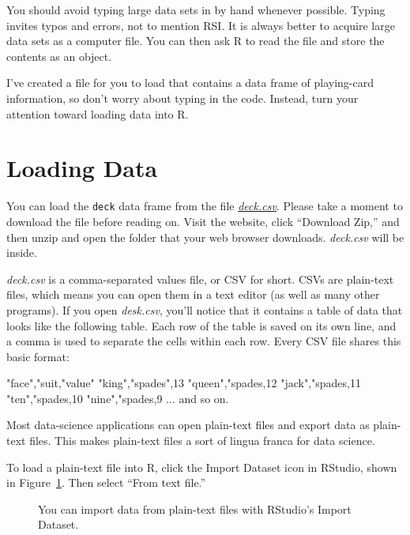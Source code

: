 \documentclass[
  letterpaper,
  DIV=11,
  numbers=noendperiod]{scrbook}
\makeatletter
\newenvironment{Shaded}{\begin{snugshade}}{\end{snugshade}}
\newcommand{\NormalTok}[1]{\textcolor[rgb]{0.00,0.23,0.31}{#1}}
\newcommand*\pandocbounded[1]{%
  \sbox\pandoc@box{#1}%
  \Gscale@div\@tempa{\textheight}{\dimexpr\ht\pandoc@box+\dp\pandoc@box\relax}%
  \Gscale@div\@tempb{\linewidth}{\wd\pandoc@box}%
  \ifdim\@tempb\p@<\@tempa\p@\let\@tempa\@tempb\fi%
  \ifdim\@tempa\p@<\p@\scalebox{\@tempa}{\usebox\pandoc@box}%
  \else\usebox{\pandoc@box}%
  \fi%
}
\makeatother
\begin{document}
You should avoid typing large data sets in by hand whenever possible.
Typing invites typos and errors, not to mention RSI. It is always better
to acquire large data sets as a computer file. You can then ask R to
read the file and store the contents as an object.

I've created a file for you to load that contains a data frame of
playing-card information, so don't worry about typing in the code.
Instead, turn your attention toward loading data into R.

\section{Loading Data}\label{sec-loading-data}

You can load the \texttt{deck} data frame from the file
\href{http://bit.ly/deck_CSV}{\emph{deck.csv}}. Please take a moment to
download the file before reading on. Visit the website, click ``Download
Zip,'' and then unzip and open the folder that your web browser
downloads. \emph{deck.csv} will be inside.

\emph{deck.csv} is a comma-separated values file, or CSV for short. CSVs
are plain-text files, which means you can open them in a text editor (as
well as many other programs). If you open \emph{desk.csv}, you'll notice
that it contains a table of data that looks like the following table.
Each row of the table is saved on its own line, and a comma is used to
separate the cells within each row. Every CSV file shares this basic
format:

\begin{Shaded}
\begin{Highlighting}[]
\NormalTok{"face","suit,"value"}
\NormalTok{"king","spades",13}
\NormalTok{"queen","spades,12}
\NormalTok{"jack","spades,11}
\NormalTok{"ten","spades,10}
\NormalTok{"nine","spades,9}
\NormalTok{... and so on.}
\end{Highlighting}
\end{Shaded}

Most data-science applications can open plain-text files and export data
as plain-text files. This makes plain-text files a sort of lingua franca
for data science.

To load a plain-text file into R, click the Import Dataset icon in
RStudio, shown in Figure~\ref{fig-import}. Then select ``From text
file.''

\begin{figure}

\centering{

\pandocbounded{\texttt{[image: images/hopr\_0303.png]}}

}

\caption{\label{fig-import}You can import data from plain-text files
with RStudio's Import Dataset.}

\end{figure}%
\end{document}
